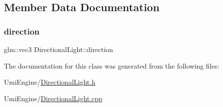 \subsection{Member Data Documentation}
\mbox{\label{class_directional_light_a5b2956fd8583e5ef45fbf1f1e778cd39}} 
\subsubsection{\texorpdfstring{direction}{direction}}
{\footnotesize\ttfamily glm\+::vec3 Directional\+Light\+::direction}



The documentation for this class was generated from the following files\+:\begin{DoxyCompactItemize}
\item 
Umi\+Engine/\mbox{\hyperlink{_directional_light_8h}{Directional\+Light.\+h}}\item 
Umi\+Engine/\mbox{\hyperlink{_directional_light_8cpp}{Directional\+Light.\+cpp}}\end{DoxyCompactItemize}
